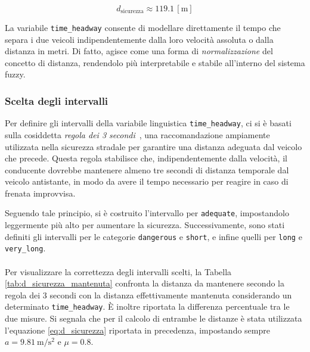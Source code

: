 \[
d_{\mathrm{sicurezza}} \approx 119.1\,[\mathrm{m}]
\]

\noindent La variabile \texttt{time\_headway} consente di modellare direttamente il tempo che separa i due veicoli 
indipendentemente dalla loro velocità assoluta o dalla distanza in metri. Di fatto, agisce come una forma di 
\emph{normalizzazione} del concetto di distanza, rendendolo più interpretabile e stabile all'interno del sistema fuzzy.

\subsubsection{Scelta degli intervalli} 
Per definire gli intervalli della variabile linguistica \texttt{time\_headway}, 
ci si è basati sulla cosiddetta \emph{regola dei 3 secondi}~\cite{benzinazero2016}, 
una raccomandazione ampiamente utilizzata nella sicurezza stradale per garantire una distanza adeguata dal veicolo che precede. 
Questa regola stabilisce che, indipendentemente dalla velocità, il conducente dovrebbe mantenere almeno tre secondi di distanza 
temporale dal veicolo antistante, in modo da avere il tempo necessario per reagire in caso di frenata improvvisa. 

\noindent Seguendo tale principio, si è costruito l'intervallo per \texttt{adequate}, impostandolo leggermente più alto per aumentare la sicurezza. 
Successivamente, sono stati definiti gli intervalli per le categorie \texttt{dangerous} e \texttt{short}, 
e infine quelli per \texttt{long} e \texttt{very\_long}. 
\\\\
\noindent Per visualizzare la correttezza degli intervalli scelti, la Tabella \ref{tab:d_sicurezza_mantenuta} confronta la distanza da mantenere 
secondo la regola dei 3 secondi con la distanza effettivamente mantenuta considerando un determinato \texttt{time\_headway}. 
È inoltre riportata la differenza percentuale tra le due misure. 
Si segnala che per il calcolo di entrambe le distanze è stata utilizzata l'equazione \ref{eq:d_sicurezza} riportata in precedenza, 
impostando sempre $a = 9.81~\mathrm{m/s^2}$ e $\mu = 0.8$.

